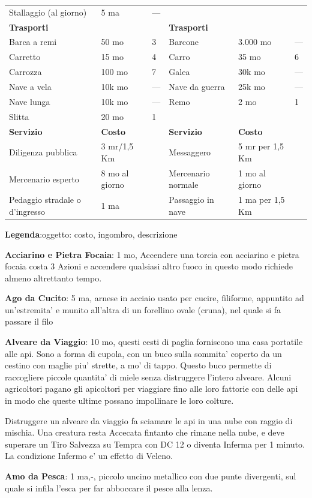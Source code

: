 \documentclass[a4paper,11pt,twoside,openany]{book}
\begin{document}
{\begin{longtable}{|L{4cm} |k{1.5cm} |k{1.5cm}|L{5cm} |k{1.5cm} |k{1.5cm}|}
Stallaggio (al giorno)&5 ma&—&&&\\
\textbf{Trasporti}&&&\textbf{Trasporti}&&\\
Barca a remi&50 mo&3&	Barcone&3.000 mo&—\\
Carretto&15 mo&4&	Carro&35 mo&6\\
Carrozza&100 mo&7&	Galea&30k mo&—\\
Nave a vela&10k mo&—&	Nave da guerra&25k mo&—\\
Nave lunga&10k mo&—&	Remo&2 mo&1\\
Slitta&20 mo&1&&&\\
\textbf{Servizio}&\textbf{Costo}&&\textbf{Servizio}&\textbf{Costo}&\\
Diligenza pubblica&3 mr/1,5 Km&&	Messaggero&5 mr per 1,5 Km&\\
Mercenario esperto&8 mo al giorno&	&Mercenario normale&1 mo al giorno&\\
Pedaggio stradale o d’ingresso&1 ma&&	Passaggio in nave&1 ma per 1,5 Km&\\
\end{longtable}

\bigskip


\textbf{Legenda}:oggetto: costo, ingombro, descrizione

\textbf{Acciarino e Pietra Focaia}: 1 mo, Accendere una torcia con acciarino e pietra focaia costa 3 Azioni e accendere qualsiasi altro fuoco in questo modo richiede almeno altrettanto tempo.

\textbf{Ago da Cucito}: 5 ma, arnese in acciaio usato per cucire, filiforme, appuntito ad un'estremita' e munito all'altra di un forellino ovale (cruna), nel quale si fa passare il filo

\textbf{Alveare da Viaggio}: 10 mo, questi cesti di paglia forniscono una casa portatile alle api. Sono a forma di cupola, con un buco sulla sommita' coperto da un cestino con maglie piu' strette, a mo' di tappo. Questo buco permette di raccogliere piccole quantita' di miele senza distruggere l'intero alveare. Alcuni agricoltori pagano gli apicoltori per viaggiare fino alle loro fattorie con delle api in modo che queste ultime possano impollinare le loro colture.

Distruggere un alveare da viaggio fa sciamare le api in una nube con raggio di mischia. Una creatura resta Accecata fintanto che rimane nella nube, e deve superare un Tiro Salvezza su Tempra con DC 12 o diventa Inferma per 1 minuto. La condizione Infermo e' un effetto di Veleno.

\textbf{Amo da Pesca}: 1 ma,-, piccolo uncino metallico con due punte divergenti, sul quale si infila l'esca per far abboccare il pesce alla lenza.

}
\end{document}
